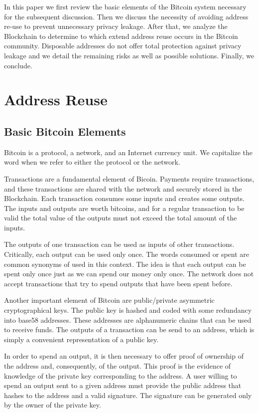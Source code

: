 \documentclass[journal]{IEEEtran}
\begin{document}
In this paper we first review the basic elements of the Bitcoin system necessary for the subsequent discussion.
Then we discuss the necessity of avoiding address re-use to prevent unnecessary privacy leakage.
After that, we analyze the Blockchain to determine to which extend address reuse occurs in the Bitcoin community.
Disposable addresses do not offer total protection against privacy leakage and we detail the remaining risks as well as possible solutions.
Finally, we conclude.

\section{Address Reuse}

\subsection{Basic Bitcoin Elements}

Bitcoin is a protocol, a network, and an Internet currency unit.
We capitalize the word when we refer to either the protocol or the network.

Transactions are a fundamental element of Bicoin.
Payments require transactions, and these transactions are shared with the network and securely stored in the Blockchain.
Each transaction consumes some inputs and creates some outputs.
The inputs and outputs are worth bitcoins, and for a regular transaction to be valid the total value of the outputs must not exceed the total amount of the inputs.

The outputs of one transaction can be used as inputs of other transactions.
Critically, each output can be used only once.
The words consumed or spent are common synonyms of used in this context.
The idea is that each output can be spent only once just as we can spend our money only once.
The network does not accept transactions that try to spend outputs that have been spent before.

Another important element of Bitcoin are public/private asymmetric cryptographical keys.
The public key is hashed and coded with some redundancy into base58 addresses.
These addresses are alphanumeric chains that can be used to receive funds.
The outputs of a transaction can be send to an address, which is simply a convenient representation of a public key.

In order to spend an output, it is then necessary to offer proof of ownership of the address and, consequently, of the output.
This proof is the evidence of knowledge of the private key corresponding to the address.
A user willing to spend an output sent to a given address must provide the public address that hashes to the address and a valid signature.
The signature can be generated only by the owner of the private key.
\end{document}
